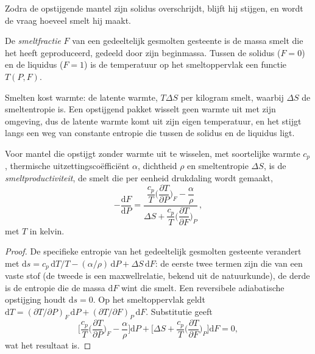 Zodra de opstijgende mantel zijn solidus overschrijdt, blijft hij stijgen, en wordt de vraag
hoeveel smelt hij maakt.

\begin{definition}[Smeltfractie]\label{def:b2:mantle-melting:fraction}
De \emph{smeltfractie} $F$ van een gedeeltelijk gesmolten gesteente is
de massa smelt die het heeft geproduceerd, gedeeld door zijn beginmassa. Tussen de solidus
($F = 0$) en de liquidus ($F = 1$) is de temperatuur op het smeltoppervlak een
functie $T(P, F)$.
\end{definition}

Smelten kost warmte: de latente warmte, $T\Delta S$ per kilogram smelt, waarbij
$\Delta S$ de smeltentropie is. Een opstijgend pakket wisselt geen warmte uit met zijn
omgeving, dus de latente warmte komt uit zijn eigen temperatuur, en het stijgt
langs een weg van constante entropie die tussen de solidus en de liquidus ligt.

\begin{proposition}\label{prop:b2:mantle-melting:productivity}
Voor mantel die opstijgt zonder warmte uit te wisselen, met soortelijke warmte $c_p$, thermische
uitzettingscoëfficiënt $\alpha$, dichtheid $\rho$ en smeltentropie $\Delta S$, is de
\emph{smeltproductiviteit}, de smelt die per eenheid drukdaling
wordt gemaakt,
\[
  -\frac{\mathrm dF}{\mathrm dP} =
  \frac{\dfrac{c_p}{T}\Big(\dfrac{\partial T}{\partial P}\Big)_F - \dfrac{\alpha}{\rho}}
       {\Delta S + \dfrac{c_p}{T}\Big(\dfrac{\partial T}{\partial F}\Big)_P}\,,
\]
met $T$ in kelvin.
\end{proposition}

\begin{proof}
De specifieke entropie van het gedeeltelijk gesmolten gesteente verandert met $\mathrm ds = c_p\,
\mathrm dT/T - (\alpha/\rho)\,\mathrm dP + \Delta S\,\mathrm dF$: de eerste twee
termen zijn die van een vaste stof (de tweede is een maxwellrelatie, bekend uit de
natuurkunde), de derde is de entropie die de massa $\mathrm dF$ wint die
smelt. Een reversibele adiabatische opstijging houdt $\mathrm ds = 0$. Op het
smeltoppervlak geldt $\mathrm dT = (\partial T/\partial P)_F\,\mathrm dP + (\partial
T/\partial F)_P\,\mathrm dF$. Substitutie geeft
\[
  \Big[\frac{c_p}{T}\Big(\frac{\partial T}{\partial P}\Big)_F - \frac{\alpha}{\rho}\Big]\mathrm dP
  + \Big[\Delta S + \frac{c_p}{T}\Big(\frac{\partial T}{\partial F}\Big)_P\Big]\mathrm dF = 0,
\]
wat het resultaat is.
\end{proof}

